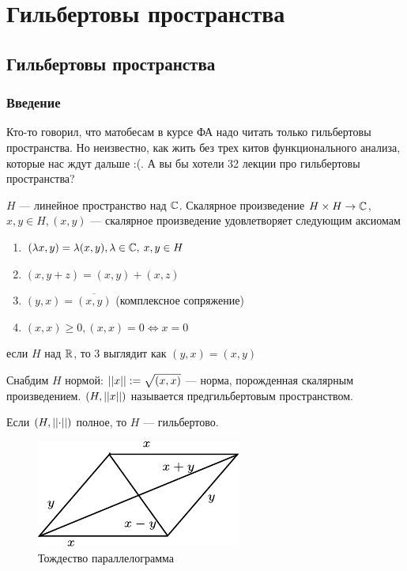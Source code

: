 \documentclass[document]{subfiles}
\begin{document}
\part{Гильбертовы пространства}
\chapter{Гильбертовы пространства}
\section{Введение}
Кто-то говорил, что матобесам в курсе ФА надо читать только гильбертовы пространства. Но неизвестно, как жить без трех китов функционального анализа, которые нас ждут дальше :(. 
А вы бы хотели 32 лекции про гильбертовы пространства?

\begin{definition}
    $H$ --- линейное пространство над $\mathbb{C}$. Скалярное произведение $H \times H \rightarrow \mathbb{C}$, $x,y \in H, (x,y)$ --- скалярное произведение удовлетворяет следующим аксиомам
    \begin{enumerate}
        \item $(\lambda x, y) = \lambda(x,y), \lambda \in \mathbb{C}, \: x,y \in H$ 
        \item $(x, y+z) = (x,y) + (x,z)$
        \item $(y,x) = \overline{(x,y)}$ (комплексное сопряжение) 
        \item $(x,x) \geq 0, (x,x) = 0 \Leftrightarrow x = 0$
    \end{enumerate}
    если $H$ над $\mathbb{R}$, то 3 выглядит как $(y,x) = (x,y)$
\end{definition}

Снабдим $H$ нормой: $\left|\left| {x} \right| \right| := \sqrt{(x,x)}$ --- норма, порожденная скалярным произведением. $(H, \left|\left| {x} \right| \right|)$ называется предгильбертовым пространством.

Если $(H, \left|\left| {\cdot} \right| \right|)$ полное, то $H$ --- гильбертово.

\begin{figure}
    \centering
    \includegraphics*{images/chapter5/parallelogram.pdf}\caption{Тождество параллелограмма}
\end{figure}
\end{document}
